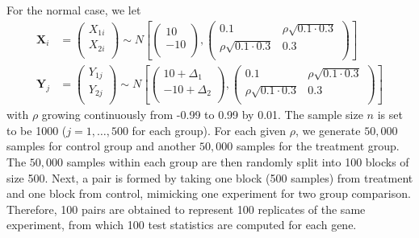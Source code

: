 \documentclass[12pt, a4paper]{article}
\begin{document}
	For the normal case, we let 
	\begin{equation}
		\begin{aligned}
			\bm X_i &=\left( \begin{array}{c}
				X_{1i}\\
				X_{2i}\\
			\end{array}\right)
			\sim N\left[
			\left(\begin{array}{c}
				10\\
				-10\\
			\end{array} \right), 
			\left(
			\begin{array}{cc}
				0.1 &\rho \sqrt{0.1\cdot 0.3} \\
				\rho \sqrt{0.1\cdot 0.3} & 	0.3 \\
			\end{array}
			\right)
			\right] \\
			\bm Y_j &= \left( \begin{array}{c}
				Y_{1j}\\
				Y_{2j}\\
			\end{array}\right)
			\sim N\left[
			\left(\begin{array}{c}
				10+ \Delta_1\\
				-10 + \Delta_2\\
			\end{array} \right), 
			\left(
			\begin{array}{cc}
				0.1 &\rho \sqrt{0.1\cdot 0.3} \\
				\rho \sqrt{0.1\cdot 0.3} & 	0.3 \\
			\end{array}
			\right)
			\right] 
		\end{aligned}
	\end{equation}
	with $\rho$ growing continuously from -0.99 to 0.99 by 0.01.  The sample size $n$ is set to be 1000
	($j =1, \ldots, 500$ for each group). For each given $\rho$, we generate $50,000$ samples for
	control group and another $50,000$ samples for the treatment group. The $50,000$ samples within each
	group are then randomly split into 100 blocks of size 500. Next, a pair is formed by taking one
	block (500 samples) from treatment and one block from control,  mimicking one experiment for two
	group comparison. Therefore, 100 pairs are obtained to represent 100 replicates of the same
	experiment, from which 100 test statistics are computed for each gene. 
	
\end{document}
